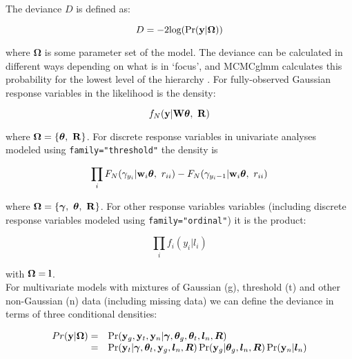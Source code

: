 \documentclass{article}
\begin{document}
The deviance $D$ is defined as:

\begin{equation}
D = -2\textrm{log}(\Pr({\bf y} | {\bm \Omega}))
\end{equation}

where ${\bm \Omega}$ is some parameter set of the model.  The deviance can be calculated in different ways depending on what is in `focus', and MCMCglmm calculates this probability for the lowest level of the hierarchy \citep{Spiegelhalter.2002}. For fully-observed Gaussian response variables in the likelihood is the density:

\begin{equation}
f_{N}({\bf y} | {\bf W}{\bm \theta},\ {\bf R}) 
\end{equation}

where ${\bm \Omega} = \left\{{\bm \theta},\ {\bf R}\right\}$.  For discrete response variables in univariate analyses modeled using \texttt{family="threshold"} the density is

\begin{equation}
\prod_{i} F_{N}(\gamma_{y_{i}} | {\bf w}_{i}{\bm \theta}, \ r_{ii})-F_{N}(\gamma_{y_{i}-1} | {\bf w}_{i}{\bm \theta}, \ r_{ii})
\end{equation}

where ${\bm \Omega} = \left\{{\bm \gamma},\ {\bm \theta},\ {\bf R}\right\}$. For other response variables variables (including discrete response variables modeled using \texttt{family="ordinal"}) it is the product:

\begin{equation}
\prod_{i}f_{i}(y_{i} | l_{i})
\label{LLikL}
\end{equation}

with ${\bm \Omega} = {\bf l}$.\\

For multivariate models with mixtures of Gaussian (g), threshold (t) and other non-Gaussian (n) data (including missing data) we can define the deviance in terms of three conditional densities:  

\begin{equation}
\begin{array}{rl}
Pr({\bf y} | {\bm \Omega}) =& \Pr({\bf y}_{g}, {\bf y}_{t}, {\bf y}_{n} | {\bm \gamma}, {\bm \theta}_{g}, {\bm \theta}_{t}, {\bm l}_{n}, {\bm R})\\
                           =& \Pr({\bf y}_{t} | {\bm \gamma}, {\bm \theta}_{t}, {\bf y}_{g}, {\bm l}_{n}, {\bm R})\Pr({\bf y}_{g} | {\bm \theta}_{g}, {\bm l}_{n}, {\bm R})\Pr({\bf y}_{n} | {\bm l}_{n})\\
\label{Eq-MVdeviance}
\end{array}
\end{equation}
\end{document}
